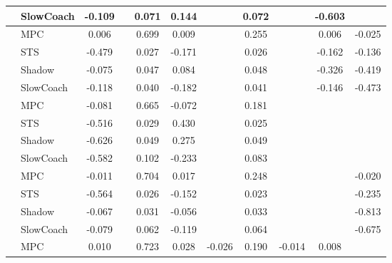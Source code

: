 \begin{tabular}{|l|l|*{9}{c|}}
                                                           & SlowCoach &   -0.109 &        &     0.071 &  0.144 &     &  0.072 &      &  -0.603 &       \\
\midrule
[True, False, True, True, False, True, False, True, True] & MPC &    0.006 &        &     0.699 &  0.009 &     &  0.255 &      &   0.006 &   -0.025 \\
                                                           & STS &   -0.479 &        &     0.027 & -0.171 &     &  0.026 &      &  -0.162 &   -0.136 \\
                                                           & Shadow &   -0.075 &        &     0.047 &  0.084 &     &  0.048 &      &  -0.326 &   -0.419 \\
                                                           & SlowCoach &   -0.118 &        &     0.040 & -0.182 &     &  0.041 &      &  -0.146 &   -0.473 \\
\midrule
[True, False, True, True, False, True, False, False, False] & MPC &   -0.081 &        &     0.665 & -0.072 &     &  0.181 &      &      &       \\
                                                           & STS &   -0.516 &        &     0.029 &  0.430 &     &  0.025 &      &      &       \\
                                                           & Shadow &   -0.626 &        &     0.049 &  0.275 &     &  0.049 &      &      &       \\
                                                           & SlowCoach &   -0.582 &        &     0.102 & -0.233 &     &  0.083 &      &      &       \\
\midrule
[True, False, True, True, False, True, False, False, True] & MPC &   -0.011 &        &     0.704 &  0.017 &     &  0.248 &      &      &   -0.020 \\
                                                           & STS &   -0.564 &        &     0.026 & -0.152 &     &  0.023 &      &      &   -0.235 \\
                                                           & Shadow &   -0.067 &        &     0.031 & -0.056 &     &  0.033 &      &      &   -0.813 \\
                                                           & SlowCoach &   -0.079 &        &     0.062 & -0.119 &     &  0.064 &      &      &   -0.675 \\
\midrule
[True, False, True, True, True, True, True, True, False] & MPC &    0.010 &        &     0.723 &  0.028 & -0.026 &  0.190 &  -0.014 &   0.008 &       \\

\end{tabular}
